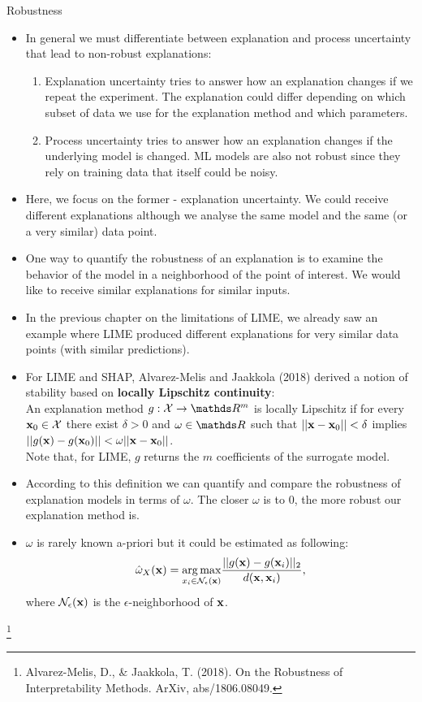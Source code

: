 \documentclass[11pt,compress,t,notes=noshow, xcolor=table]{beamer}
\begin{document}
\begin{vbframe}{Robustness}
		\begin{itemize}
		\item In general we must differentiate between explanation and process uncertainty that lead to non-robust explanations: 
		\begin{enumerate}
			\item Explanation uncertainty tries to answer how an explanation changes if we repeat the experiment. The explanation could differ depending on which subset of data we use for the explanation method and which parameters. 
			\item Process uncertainty tries to answer how an explanation changes if the underlying model is changed. ML models are also not robust since they rely on training data that itself could be noisy. 
		\end{enumerate}
		\item Here, we focus on the former - explanation uncertainty. We could receive different explanations although we analyse the same model and the same (or a very similar) data point.  
		\item One way to quantify the robustness of an explanation is to examine the behavior of the model in a neighborhood of the point of interest. We would like to receive similar explanations for similar inputs. 
		\item In the previous chapter on the limitations of LIME, we already saw an example where LIME produced different explanations for very similar data points (with similar predictions).
		\item For LIME and SHAP, Alvarez-Melis and Jaakkola (2018) derived a notion of stability based on \textbf{locally Lipschitz continuity}: \\
		An explanation method $g:\Xspace \rightarrow \R^m$ is locally Lipschitz if for every $\xv_0 \in \Xspace$ there exist $\delta > 0$ and $\omega \in \R$ such that $||\xv - \xv_0|| < \delta$ implies $||g(\xv) - g(\xv_0)|| < \omega ||\xv - \xv_0||$. \\
		\footnotesize Note that, for LIME, $g$ returns the $m$ coefficients of the surrogate model. \normalsize
		\item According to this definition we can quantify and compare the robustness of explanation models in terms of $\omega$. 
		The closer $\omega$ is to 0, the more robust our explanation method is. 
		\item $\omega$ is rarely known a-priori but it could be estimated as following: 
		$$\hat{\omega}_{X}(\xv) = \underset{x_i \in \mathcal{N}_{\epsilon}(\xv)}{\arg \max} \frac{||g(\xv) - g(\xv_i)||_2}{d(\xv, \xv_i)},$$
		where $\mathcal{N}_{\epsilon}(\xv)$ is the $\epsilon$-neighborhood of $\xv$.
	\end{itemize}
\vspace{2cm}
\footnote[frame]{Alvarez-Melis, D., \& Jaakkola, T. (2018). On the Robustness of Interpretability Methods. ArXiv, abs/1806.08049.}
\end{vbframe}
\end{document}
